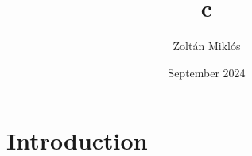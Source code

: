 \documentclass{article}
\title{c}
\author{Zoltán Miklós}
\date{September 2024}
\begin{document}
\maketitle

\section{Introduction}
\end{document}
